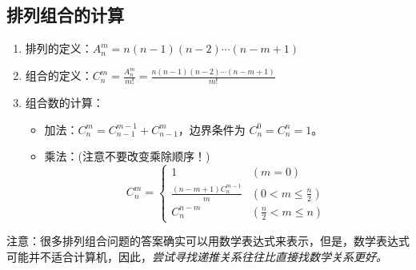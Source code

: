 \subsection{排列组合的计算}
	\begin{enumerate}
		\item 排列的定义：$A^m_n=n(n-1)(n-2)\cdots(n-m+1)$
		\item 组合的定义：$C^m_n=\frac{A^m_n}{m!}=\frac{n(n-1)(n-2)\cdots(n-m+1)}{m!}$
		\item 组合数的计算：
		\begin{itemize}
			\item 加法：$C^m_n=C^{m-1}_{n-1}+C^m_{n-1}$，边界条件为 $C^0_n=C^n_n=1$。
			\item 乘法：(注意不要改变乘除顺序！)
			\[
			C^m_n = \left\lbrace \begin{array}{ll}
			1	&	(m=0)	\\
			\frac{(n-m+1)C^{m-1}_n}{m}	&	(0<m \leqslant \frac{n}{2})	\\
			C^{n-m}_n					&	(\frac{n}{2}<m \leqslant n)
			\end{array}
			\right.
			\]
		\end{itemize}
	\end{enumerate}
	
	注意：很多排列组合问题的答案确实可以用数学表达式来表示，但是，数学表达式可能并不适合计算机，因此，\emph{尝试寻找递推关系往往比直接找数学关系更好。}
